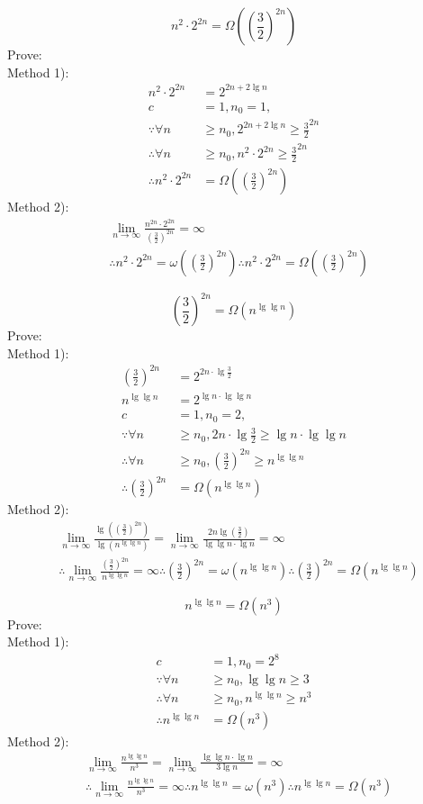 \documentclass[12pt,letterpaper]{article}
\begin{document}
\begin{enumerate}
$$n^2 \cdot 2^{2n} = \Omega ((\frac{3}{2})^{2n})$$
Prove: \\
Method 1):
\begin{align*}
n^2 \cdot 2^{2n} &= 2 ^ {2n + 2 \lg n} \\
c &= 1, n_0 = 1, \\
\because \forall n& \ge n_0, 2 ^ {2n + 2 \lg n} \ge \frac{3}{2} ^ {2n} \\
\therefore \forall n& \ge n_0, n^2 \cdot 2^{2n} \ge \frac{3}{2} ^ {2n} \\
\therefore n^2 \cdot 2^{2n} &= \Omega ((\frac{3}{2})^{2n})
\end{align*}
Method 2):
\begin{align*}
& \lim_{n \to \infty} \frac{n^{2n} \cdot 2^{2n}}{(\frac{3}{2})^{2n}} = \infty \\
& \therefore n^2 \cdot 2^{2n} = \omega((\frac{3}{2})^{2n}) \therefore n^2 \cdot 2^{2n} = \Omega((\frac{3}{2})^{2n})
\end{align*}

$$(\frac{3}{2})^{2n} = \Omega (n^{\lg \lg n})$$
Prove: \\
Method 1):
\begin{align*}
(\frac{3}{2})^{2n} &= 2 ^ {2n \cdot \lg \frac{3}{2}} \\
n ^ {\lg \lg n} &= 2 ^ {\lg n \cdot \lg \lg n} \\
c &= 1, n_0 = 2, \\
\because \forall n& \ge n_0, 2n \cdot \lg \frac{3}{2} \ge \lg n \cdot \lg \lg n \\
\therefore \forall n& \ge n_0, (\frac{3}{2})^{2n} \ge n ^ {\lg \lg n} \\
\therefore (\frac{3}{2})^{2n} &= \Omega (n^{\lg \lg n})
\end{align*}
Method 2):
\begin{align*}
& \lim_{n \to \infty} \frac{\lg ((\frac{3}{2})^{2n})}{\lg (n^{\lg \lg n})} = \lim_{n \to \infty} \frac{2n \lg (\frac{3}{2})}{\lg \lg n \cdot \lg n} = \infty \\
& \therefore \lim_{n \to \infty} \frac{(\frac{3}{2})^{2n}}{n ^ {\lg \lg n}} = \infty \therefore (\frac{3}{2})^{2n} = \omega(n^{\lg \lg n}) \therefore (\frac{3}{2})^{2n} = \Omega (n ^ {\lg \lg n})
\end{align*}

$$n^{\lg \lg n} = \Omega(n^3)$$
Prove: \\
Method 1):
\begin{align*}
c &= 1, n_0 = 2 ^ 8 \\
\because \forall n & \ge n_0, \lg \lg n \ge 3 \\
\therefore \forall n & \ge n_0, n^{\lg \lg n} \ge n ^ 3 \\
\therefore n^{\lg \lg n} & = \Omega(n^3)
\end{align*}
Method 2):
\begin{align*}
& \lim_{n \to \infty} \frac{n^{\lg \lg n}}{n^3} = \lim_{n \to \infty} \frac{\lg \lg n \cdot \lg n}{3 \lg n} = \infty \\
& \therefore \lim_{n \to \infty} \frac{n ^ {\lg \lg n}}{n^3} = \infty \therefore n^{\lg \lg n} = \omega (n^3) \therefore n^{\lg \lg n} = \Omega(n^3)
\end{align*}


\end{enumerate}
\end{document}

